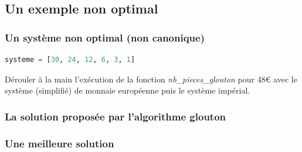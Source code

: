 \documentclass[svgnames,11pt]{beamer}
\begin{document}
\subsection{Un exemple non optimal}
\begin{frame}[fragile]
    \frametitle{Un système non optimal (non canonique)}

    \begin{center}
        \begin{lstlisting}[language=Python]
systeme = [30, 24, 12, 6, 3, 1]
        \end{lstlisting}
        \label{systeme}
    \end{center}
    \begin{activite}
        Dérouler à la main l'exécution de la fonction \emph{nb\_pieces\_glouton} pour 48€ avec le système (simplifié) de monnaie européenne puis le système impérial.
    \end{activite}
\end{frame}


\begin{frame}
    \frametitle{La solution proposée par l'algorithme glouton}

    \begin{center}
        \label{moncode}
    \end{center}

\end{frame}
\begin{frame}
    \frametitle{Une meilleure solution}

    \begin{center}
        \label{moncode}
    \end{center}

\end{frame}
\end{document}
